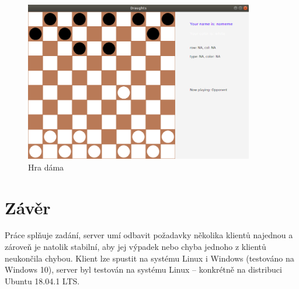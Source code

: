 \documentclass[12pt, a4paper]{article}
\begin{document}
\begin {figure}[h]
\centering
\includegraphics[width=10cm]{img/ingame}
\caption{Hra dáma}
\label{fig:hra}
\end {figure}
\section{Závěr}
Práce splňuje zadání, server umí odbavit požadavky několika klientů najednou a zároveň je natolik stabilní, aby jej výpadek nebo chyba jednoho z klientů neukončila chybou. Klient lze spustit na systému Linux i Windows (testováno na Windows 10), server byl testován na systému Linux – konkrétně na distribuci Ubuntu 18.04.1 LTS.
\end{document}

